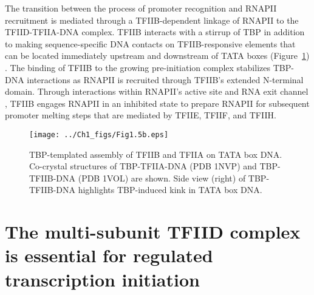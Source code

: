 \indent The transition between the process of promoter recognition and RNAPII recruitment is mediated through a TFIIB-dependent linkage of RNAPII to the TFIID-TFIIA-DNA complex. TFIIB interacts with a stirrup of TBP in addition to making sequence-specific DNA contacts on TFIIB-responsive elements that can be located immediately upstream and downstream of TATA boxes (Figure~\ref{fig:Fig1.5}) \cite{Lagrange_2618, Nikolov_3177}. The binding of TFIIB to the growing pre-initiation complex stabilizes TBP-DNA interactions as RNAPII is recruited through TFIIB’s extended N-terminal domain. Through interactions within RNAPII's active site and RNA exit channel \cite{Kostrewa_659}, TFIIB engages RNAPII in an inhibited state to prepare RNAPII for subsequent promoter melting steps that are mediated by TFIIE, TFIIF, and TFIIH. \\
\begin{figure}
\centering
\texttt{[image: ../Ch1\_figs/Fig1.5b.eps]}
\caption[TBP-templated assembly of TFIIB and TFIIA on TATA box DNA]{TBP-templated assembly of TFIIB and TFIIA on TATA box DNA. Co-crystal structures of TBP-TFIIA-DNA (PDB 1NVP) \cite{Bleichenbacher_2003} and TBP-TFIIB-DNA (PDB 1VOL) \cite{Nikolov_3177} are shown.  Side view (right) of TBP-TFIIB-DNA highlights TBP-induced kink in TATA box DNA.}
\label{fig:Fig1.5}
\end{figure}


\section{The multi-subunit TFIID complex is essential for regulated transcription initiation}

